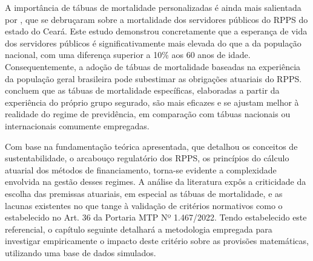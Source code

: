 A importância de tábuas de mortalidade personalizadas é ainda mais salientada por , que se debruçaram sobre a mortalidade dos servidores públicos do RPPS do estado do Ceará. Este estudo demonstrou concretamente que a esperança de vida dos servidores públicos é significativamente mais elevada do que a da população nacional, com uma diferença superior a 10\% aos 60 anos de idade. Consequentemente, a adoção de tábuas de mortalidade baseadas na experiência da população geral brasileira pode subestimar as obrigações atuariais do RPPS.  concluem que as tábuas de mortalidade específicas, elaboradas a partir da experiência do próprio grupo segurado, são mais eficazes e se ajustam melhor à realidade do regime de previdência, em comparação com tábuas nacionais ou internacionais comumente empregadas.

Com base na fundamentação teórica apresentada, que detalhou os conceitos de sustentabilidade, o arcabouço regulatório dos RPPS, os princípios do cálculo atuarial dos métodos de financiamento, torna-se evidente a complexidade envolvida na gestão desses regimes. A análise da literatura expôs a criticidade da escolha das premissas atuariais, em especial as tábuas de mortalidade, e as lacunas existentes no que tange à validação de critérios normativos como o estabelecido no Art. 36 da Portaria MTP Nº 1.467/2022. Tendo estabelecido este referencial, o capítulo seguinte detalhará a metodologia empregada para investigar empiricamente o impacto deste critério sobre as provisões matemáticas, utilizando uma base de dados simulados.